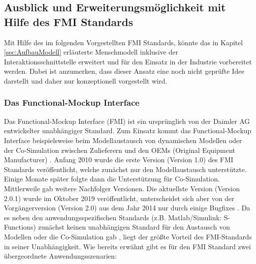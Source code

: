 \subsection{Ausblick und Erweiterungsmöglichkeit mit Hilfe des FMI Standards}\label{sec:AusblickFMI}
Mit Hilfe des im folgenden Vorgestellten FMI Standards, könnte das in Kapitel \ref{sec:AufbauModell} erläuterte Menschmodell inklusive der Interaktionsschnittstelle erweitert und für den Einsatz in der Industrie vorbereitet werden. Dabei ist anzumerken, dass dieser Ansatz eine noch nicht geprüfte Idee darstellt und daher nur konzeptionell vorgestellt wird.
\newpage

\subsubsection{Das Functional-Mockup Interface}\label{sec:DasFMU}
Das Functional-Mockup Interface (FMI) ist ein ursprünglich von der Daimler AG entwickelter unabhängiger Standard. Zum Einsatz kommt das Functional-Mockup Interface beispielsweise beim Modellaustausch von dynamischen Modellen oder der Co-Simulation zwischen Zulieferern und den OEMs (Original Equipment Manufacturer) \cite[S.1]{24}.
Anfang 2010 wurde die erste Version (Version 1.0) des FMI Standards veröffentlicht, welche zunächst nur den Modellaustausch unterstützte. Einige Monate später folgte dann die Unterstützung für Co-Simulation. Mittlerweile gab weitere Nachfolger Versionen. Die aktuellste Version (Version 2.0.1) wurde im Oktober 2019 veröffentlicht, unterscheidet sich aber von der Vorgängerversion (Version 2.0) aus dem Jahr 2014 nur durch einige Bugfixes \cite[S.2]{25}.
Da es neben den anwendungsspezifischen Standards (z.B. Matlab/Simulink: S-Functions) zunächst keinen unabhängigen Standard für den Austausch von Modellen oder die Co-Simulation gab \cite[S.1]{24}, liegt der größte Vorteil des FMI-Standards in seiner Unabhängigkeit.
\newline
Wie bereits erwähnt gibt es für den FMI Standard zwei übergeordnete Anwendungsszenarien:
